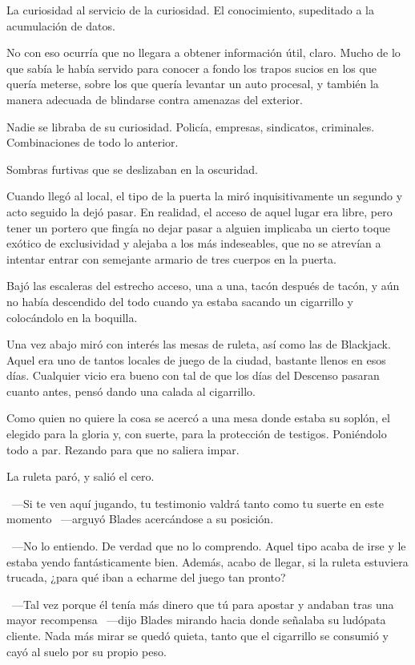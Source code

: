 La curiosidad al servicio de la curiosidad. El conocimiento, supeditado a la acumulación de datos.

No con eso ocurría que no llegara a obtener información útil, claro. Mucho de lo que sabía le había servido para conocer a fondo los trapos sucios en los que quería meterse, sobre los que quería levantar un auto procesal, y también la manera adecuada de blindarse contra amenazas del exterior.

Nadie se libraba de su curiosidad. Policía, empresas, sindicatos, criminales. Combinaciones de todo lo anterior.

Sombras furtivas que se deslizaban en la oscuridad.

Cuando llegó al local, el tipo de la puerta la miró inquisitivamente un segundo y acto seguido la dejó pasar. En realidad, el acceso de aquel lugar era libre, pero tener un portero que fingía no dejar pasar a alguien implicaba un cierto toque exótico de exclusividad y alejaba a los más indeseables, que no se atrevían a intentar entrar con semejante armario de tres cuerpos en la puerta.

Bajó las escaleras del estrecho acceso, una a una, tacón después de tacón, y aún no había descendido del todo cuando ya estaba sacando un cigarrillo y colocándolo en la boquilla.

Una vez abajo miró con interés las mesas de ruleta, así como las de Blackjack. Aquel era uno de tantos locales de juego de la ciudad, bastante llenos en esos días. Cualquier vicio era bueno con tal de que los días del Descenso pasaran cuanto antes, pensó dando una calada al cigarrillo.

Como quien no quiere la cosa se acercó a una mesa donde estaba su soplón, el elegido para la gloria y, con suerte, para la protección de testigos. Poniéndolo todo a par. Rezando para que no saliera impar.

La ruleta paró, y salió el cero.

~---Si te ven aquí jugando, tu testimonio valdrá tanto como tu suerte en este momento ~---arguyó Blades acercándose a su posición.
 
~---No lo entiendo. De verdad que no lo comprendo. Aquel tipo acaba de irse y le estaba yendo fantásticamente bien. Además, acabo de llegar, si la ruleta estuviera trucada, ¿para qué iban a echarme del juego tan pronto?

~---Tal vez porque él tenía más dinero que tú para apostar y andaban tras una mayor recompensa ~---dijo Blades mirando hacia donde señalaba su ludópata cliente. Nada más mirar se quedó quieta, tanto que el cigarrillo se consumió y cayó al suelo por su propio peso.

